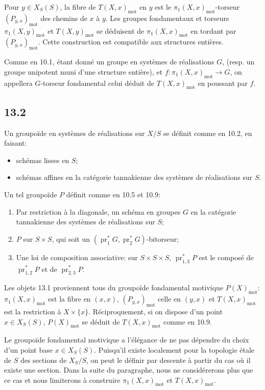 \documentclass[12pt,a4paper]{article}
\theoremstyle{plain}
\theoremstyle{definition}
\theoremstyle{remark}
\DeclareMathOperator{\pr}{pr}
\newcommand{\mot}{\mathrm{mot}}
\begin{document}
Pour $y \in X_S(S)$, la fibre de $T(X,x)_{\mot}$ en $y$ est le $\pi_1(X,x)_{\mot}$-torseur $(P_{y,x})_{\mot}$ des chemins de $x$ à $y$. Les groupes fondamentaux et torseurs $\pi_1(X,y)_{\mot}$ et $T(X,y)_{\mot}$ se déduisent de $\pi_1(X,x)_{\mot}$ en tordant par $(P_{y,x})_{\mot}$. Cette construction est compatible aux structures entières.

Comme en 10.1, étant donné un groupe en systèmes de réalisations $G$, (resp. un groupe unipotent muni d'une structure entière), et $f : \pi_1(X,x)_{\mot} \to G$, on appellera $G$-torseur fondamental celui déduit de $T(X,x)_{\mot}$ en poussant par $f$.

\subsection*{13.2}

Un groupoïde en systèmes de réalisations sur $X/S$ se définit comme en 10.2, en faisant:
\begin{itemize}[nosep]
\item[$S$:] schémas lisses en $S$;
\item[$\mathcal{F}(T)$:] schémas affines en la catégorie tannakienne des systèmes de réalisations sur $S$.
\end{itemize}
Un tel groupoïde $P$ définit comme en 10.5 et 10.9:
\begin{enumerate}[label=(\alph*), nosep]
\item Par restriction à la diagonale, un schéma en groupes $G$ en la catégorie tannakienne des systèmes de réalisations sur $S$;
\item $P$ sur $S \times S$, qui soit un $(\pr_1^* G, \pr_2^* G)$-bitorseur;
\item Une loi de composition associative: sur $S \times S \times S$, $\pr_{1,3}^* P$ est le composé de $\pr_{1,2}^* P$ et de $\pr_{2,3}^* P$.
\end{enumerate}

Les objets 13.1 proviennent tous du groupoïde fondamental motivique $P(X)_{\mot}$: $\pi_1(X,x)_{\mot}$ est la fibre en $(x,x)$, $(P_{y,x})_{\mot}$ celle en $(y,x)$ et $T(X,x)_{\mot}$ est la restriction à $X \times \{x\}$. Réciproquement, si on dispose d'un point $x \in X_S(S)$, $P(X)_{\mot}$ se déduit de $T(X,x)_{\mot}$ comme en 10.9.

Le groupoïde fondamental motivique a l'élégance de ne pas dépendre du choix d'un point base $x \in X_S(S)$. Puisqu'il existe localement pour la topologie étale de $S$ des sections de $X_S/S$, on peut le définir par descente à partir du cas où il existe une section. Dans la suite du paragraphe, nous ne considérerons plus que ce cas et nous limiterons à construire $\pi_1(X,x)_{\mot}$ et $T(X,x)_{\mot}$.
\end{document}
